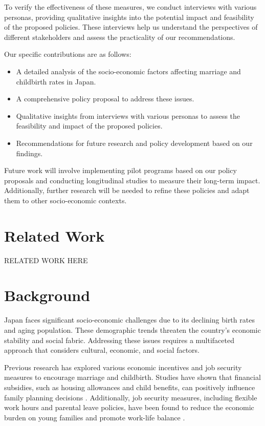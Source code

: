 \documentclass{article} %
\begin{document}
To verify the effectiveness of these measures, we conduct interviews with various personas, providing qualitative insights into the potential impact and feasibility of the proposed policies. These interviews help us understand the perspectives of different stakeholders and assess the practicality of our recommendations.

Our specific contributions are as follows:
\begin{itemize}
    \item A detailed analysis of the socio-economic factors affecting marriage and childbirth rates in Japan.
    \item A comprehensive policy proposal to address these issues.
    \item Qualitative insights from interviews with various personas to assess the feasibility and impact of the proposed policies.
    \item Recommendations for future research and policy development based on our findings.
\end{itemize}

Future work will involve implementing pilot programs based on our policy proposals and conducting longitudinal studies to measure their long-term impact. Additionally, further research will be needed to refine these policies and adapt them to other socio-economic contexts.

\section{Related Work}
\label{sec:related}
RELATED WORK HERE

\section{Background}
\label{sec:background}

Japan faces significant socio-economic challenges due to its declining birth rates and aging population. These demographic trends threaten the country's economic stability and social fabric. Addressing these issues requires a multifaceted approach that considers cultural, economic, and social factors.

Previous research has explored various economic incentives and job security measures to encourage marriage and childbirth. Studies have shown that financial subsidies, such as housing allowances and child benefits, can positively influence family planning decisions \citep{poledna2023economic}. Additionally, job security measures, including flexible work hours and parental leave policies, have been found to reduce the economic burden on young families and promote work-life balance \citep{zhou2023peer}.
\end{document}
